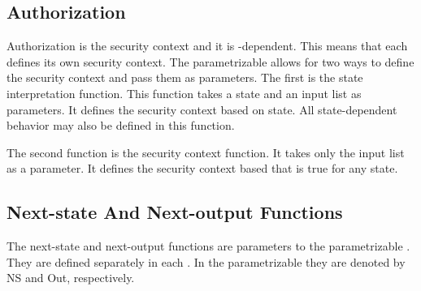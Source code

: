 \documentclass[../../main/main.tex]{subfiles}
\begin{document}
\subsection{Authorization}
Authorization is the security context and it is -dependent. This means that each  defines its own security context.  The parametrizable  allows for two ways to define the security context and pass them as parameters.  The first is the state interpretation function. This function takes a state and an input list as parameters.  It defines the security context based on state.  All state-dependent behavior may also be defined in this function.

The second function is the security context function.  It takes only the input list as a parameter.  It defines the security context based that is true for any state.

\subsection{Next-state And Next-output Functions}
The next-state and next-output functions are parameters to the parametrizable .  They are defined separately in each .  In the parametrizable  they are denoted by NS and Out, respectively.
\end{document}
